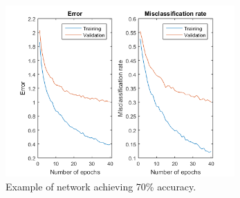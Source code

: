 \documentclass[a4paper,11pt]{article}
\begin{document}
\begin{figure}[h]
	\centering
	\includegraphics[width=0.78\textwidth]{training_loss.png}
	\caption{Example of network achieving 70\% accuracy.}
\end{figure}
\end{document}
